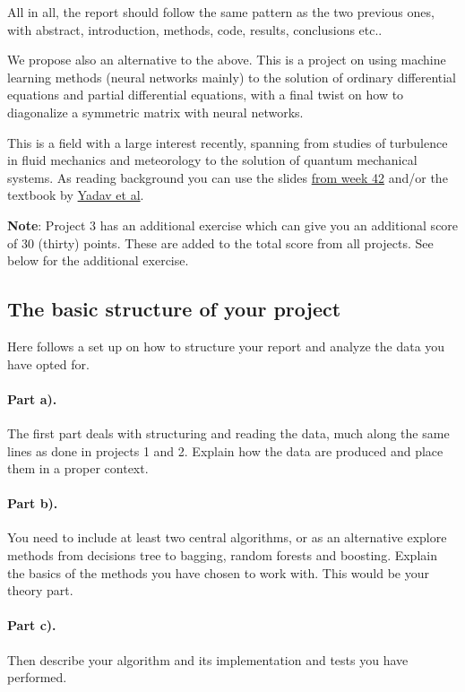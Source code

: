 \documentclass[%
oneside,                 %
final,                   %
10pt]{article}
\begin{document}
\noindent
All in all, the report should follow the same pattern as the two previous ones, with abstract, introduction, methods, code, results, conclusions etc..

We propose also an alternative to the above. This is a project on using machine learning methods (neural networks mainly) to the solution of ordinary differential equations and partial differential equations, with a final twist on how to diagonalize a symmetric matrix with neural networks.

This is a field with a large interest recently, spanning from studies of turbulence in fluid mechanics and meteorology to the solution of quantum mechanical systems. As reading background you can use the slides \href{{https://compphysics.github.io/MachineLearning/doc/pub/week42/html/week42.html}}{from week 42} and/or the textbook by \href{{https://www.springer.com/gp/book/9789401798150}}{Yadav et al}.

\textbf{Note}: Project 3 has an additional exercise which can give you an additional score of 30 (thirty) points. These are added to the total score from all projects. See below for the additional exercise. 

\subsection*{The basic structure of your project}

Here follows a set up on how to structure your report and analyze the data you have opted for.

\paragraph{Part a).}
The first part deals with structuring and reading the data, much along the same lines as done in projects 1 and 2.  Explain how the data are produced and place them in a proper context.

\paragraph{Part b).}
You need to include at least two central algorithms, or as an alternative explore methods from decisions tree to bagging, random forests and boosting. Explain the basics of the methods you have chosen to work with. This would be your theory part.

\paragraph{Part c).}
Then describe your algorithm and its implementation and tests you have performed.
\end{document}
